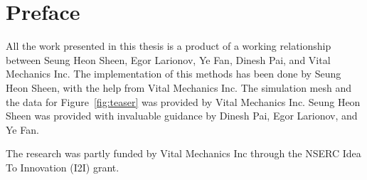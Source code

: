 
\chapter{Preface}

All the work presented in this thesis is a product of a working relationship between Seung Heon Sheen, Egor Larionov, Ye Fan, Dinesh Pai, and Vital Mechanics Inc.
The implementation of this methods has been done by Seung Heon Sheen, with the help from Vital Mechanics Inc. 
The simulation mesh and the data for Figure~\ref{fig:teaser} was provided by Vital Mechanics Inc.
Seung Heon Sheen was provided with invaluable guidance by Dinesh Pai, Egor Larionov, and Ye Fan. 

\medskip

The research was partly funded by Vital Mechanics Inc through the NSERC Idea To Innovation (I2I) grant.

